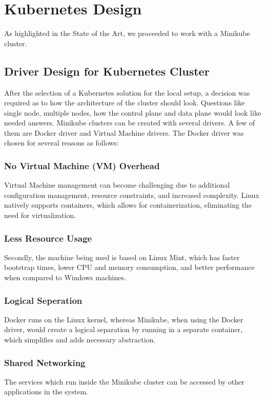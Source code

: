 \section{Kubernetes Design}
As highlighted in the State of the Art, we proceeded to work with a Minikube cluster.

\subsection{Driver Design for Kubernetes Cluster}
After the selection of a Kubernetes solution for the local setup, a decision was required as to how the architecture of the cluster should look. Questions like single node, multiple nodes, how the control plane and data plane would look like needed answers. Minikube clusters can be created with several drivers. A few of them are Docker driver and Virtual Machine drivers. The Docker driver was chosen for several reasons as follows:

\subsubsection{No Virtual Machine (VM) Overhead}
Virtual Machine management can become challenging due to additional configuration management, resource constraints, and increased complexity. Linux natively supports containers, which allows for containerization, eliminating the need for virtualization. 

\subsubsection{Less Resource Usage}
Secondly, the machine being used is based on Linux Mint, which has faster bootstrap times, lower CPU and memory consumption, and better performance when compared to Windows machines.

\subsubsection{Logical Seperation}
Docker runs on the Linux kernel, whereas Minikube, when using the Docker driver, would create a logical separation by running in a separate container, which simplifies and adds necessary abstraction.

\subsubsection{Shared Networking}
The services which run inside the Minikube cluster can be accessed by other applications in the system.

